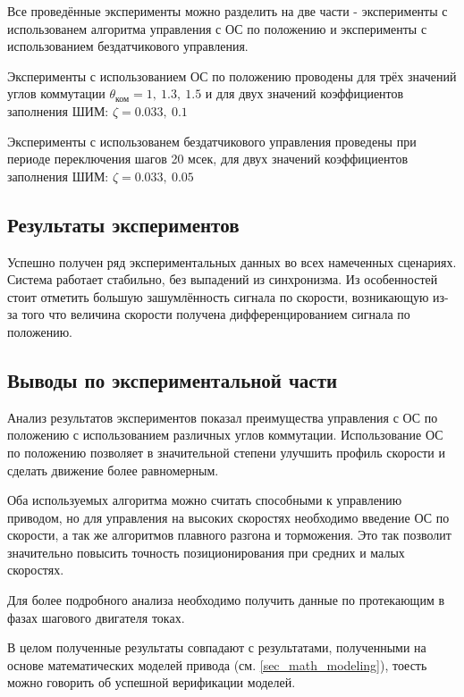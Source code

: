 Все проведённые эксперименты можно разделить на две части - эксперименты с
использованем алгоритма управления с ОС по положению и эксперименты
с использованием бездатчикового управления.

Эксперименты с использованием ОС по положению проводены для трёх значений
углов коммутации $\theta_\text{ком} = 1, ~1.3, ~1.5$ и для двух значений
коэффициентов заполнения ШИМ: $\zeta = 0.033, ~0.1$

Эксперименты с использованем бездатчикового управления проведены при периоде
переключения шагов 20 мсек, для двух значений коэффициентов заполнения ШИМ:
$\zeta = 0.033, ~0.05$

\subsection{Результаты экспериментов}

Успешно получен ряд экспериментальных данных во всех намеченных сценариях.
Система работает стабильно, без выпадений из синхронизма.
Из особенностей стоит отметить большую зашумлённость сигнала по скорости,
возникающую из-за того что величина скорости получена дифференцированием сигнала
по положению.

\subsection{Выводы по экспериментальной части}

Анализ результатов экспериментов показал преимущества управления с ОС
по положению с использованием различных углов коммутации. Использование ОС
по положению позволяет в значительной степени улучшить профиль скорости
и сделать движение более равномерным.

Оба используемых алгоритма можно считать способными к управлению приводом, но
для управления на высоких скоростях необходимо введение ОС по скорости, а так же
алгоритмов плавного разгона и торможения. Это так позволит значительно повысить
точность позиционирования при средних и малых скоростях.

Для более подробного анализа необходимо получить данные по протекающим в фазах
шагового двигателя токах.

В целом полученные результаты совпадают с результатами, полученными на основе
математических моделей привода (см. \ref{sec_math_modeling}), тоесть можно говорить
об успешной верификации моделей.
